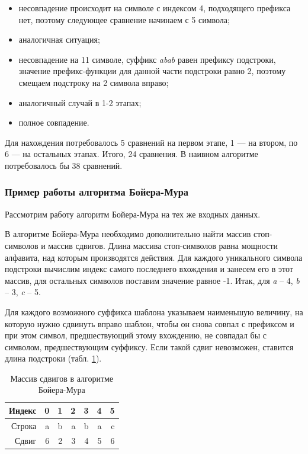 \documentclass[a4paper,12pt]{article}
\begin{document}
\begin{itemize}
\item[1)] несовпадение происходит на символе с индексом 4,
подходящего префикса нет, поэтому следующее сравнение начинаем с 5 символа;
\item[2)] аналогичная ситуация;
\item[3)] несовпадение на 11 символе, суффикс \textit{abab}
равен префиксу подстроки, значение префикс-функции для данной части подстроки
равно 2, поэтому смещаем подстроку на 2 символа вправо;
\item[4)] аналогичный случай в 1-2 этапах;
\item[5)] полное совпадение.
\end{itemize}

Для нахождения потребовалось 5 сравнений на первом этапе, 1 --- на втором,
по 6 --- на остальных этапах. Итого, 24 сравнения. В наивном алгоритме
потребовалось бы 38 сравнений.

\subsubsection{Пример работы алгоритма Бойера-Мура}

Рассмотрим работу алгоритм Бойера-Мура на тех же входных данных.

В алгоритме Бойера-Мура необходимо дополнительно найти
массив стоп-символов и массив сдвигов.
Длина массива стоп-символов равна мощности алфавита, над которым производятся действия.
Для каждого уникального символа подстроки вычислим индекс самого последнего вхождения
и занесем его в этот массив, для остальных символов поставим значение равное -1.
Итак, для \textit{a} -- 4, \textit{b} -- 3, \textit{c} -- 5.

Для каждого возможного суффикса шаблона указываем наименьшую величину,
на которую нужно сдвинуть вправо шаблон,
чтобы он снова совпал с префиксом и при этом символ,
предшествующий этому вхождению, не совпадал бы с символом, предшествующим суффиксу.
Если такой сдвиг невозможен, ставится длина подстроки (табл. \ref{shift_}).

\begin{table} [h!]
\begin{center}
\caption{Массив сдвигов в алгоритме Бойера-Мура}
\begin{tabular}{|r|rrrrrr|}
\hline
Индекс & 0 &          1 &          2 &          3 &          4 &          5 \\
\hline
Строка &         a &          b &          a &          b &          a &          c \\
\hline
Сдвиг &         6 &          2 &          3 &          4 &          5 &          6 \\
\hline
\end{tabular}  
\label{shift_}
\end{center}
\end{table}
\end{document}
